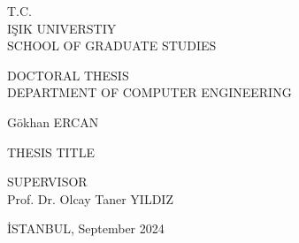\thispagestyle{empty}
\vspace*{-4cm}

\reversemarginpar
\marginnote{
 }

 
\begin{center}	
\vspace*{3.5cm}

\begin{center}
\large{T.C.} \\
\large{IŞIK UNIVERSTIY} \\
\large{SCHOOL OF GRADUATE STUDIES}
\end{center}

\vspace*{2cm}

\large{DOCTORAL THESIS} \\
\large{DEPARTMENT OF COMPUTER ENGINEERING} \\

\vspace*{2cm}

\large{Gökhan ERCAN}
\vspace{1\baselineskip}		%

\vspace*{2cm}

\large{
	THESIS TITLE
}

\vspace*{2cm}

\large{
	SUPERVISOR
}\\
\large{Prof. Dr. Olcay Taner YILDIZ}


\vspace*{4cm}
İSTANBUL, September 2024

\end{center}

